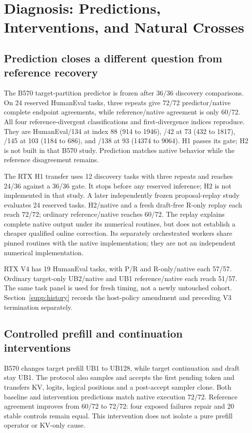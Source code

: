 \section{Diagnosis: Predictions, Interventions, and Natural Crosses}
\label{supp:diagnosis}
\subsection{Prediction closes a different question from reference recovery}
\label{supp:prediction}
The B570 target-partition predictor is frozen after 36/36 discovery comparisons. On 24 reserved HumanEval tasks, three repeats give 72/72 predictor/native complete endpoint agreements, while reference/native agreement is only 60/72. All four reference-divergent classifications and first-divergence indices reproduce. They are HumanEval/134 at index 88 (914 to 1946), /42 at 73 (432 to 1817), /145 at 103 (1184 to 686), and /138 at 93 (14374 to 9064). H1 passes its gate; H2 is not built in that B570 study. Prediction matches native behavior while the reference disagreement remains.

The RTX H1 transfer uses 12 discovery tasks with three repeats and reaches 24/36 against a 36/36 gate. It stops before any reserved inference; H2 is not implemented in that study. A later independently frozen proposal-replay study evaluates 24 reserved tasks. H2/native and a fresh draft-free R-only replay each reach 72/72; ordinary reference/native reaches 60/72. The replay explains complete native output under its numerical routines, but does not establish a cheaper qualified online correction. Its separately orchestrated workers share pinned routines with the native implementation; they are not an independent numerical implementation.

RTX V4 has 19 HumanEval tasks, with P/R and R-only/native each 57/57. Ordinary target-only UB2/native and UB1 reference/native each reach 51/57. The same task panel is used for fresh timing, not a newly untouched cohort. Section~\ref{supp:history} records the host-policy amendment and preceding V3 termination separately.

\subsection{Controlled prefill and continuation interventions}
\label{supp:controlled_interventions}
B570 changes target prefill UB1 to UB128, while target continuation and draft stay UB1. The protocol also samples and accepts the first pending token and transfers KV, logits, logical positions and a post-accept sampler clone. Both baseline and intervention predictions match native execution 72/72. Reference agreement improves from 60/72 to 72/72: four exposed failures repair and 20 stable controls remain equal. This intervention does not isolate a pure prefill operator or KV-only cause.

